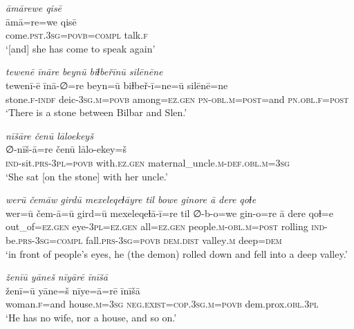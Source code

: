 \ea \label{ZP.46}
\textit{āmārewe qisē} \\ 
\gll āmā=re=we qisē \\ 
 come\textsc{.pst}\textsc{.3sg}\textsc{=\textsc{povb}}\textsc{=\textsc{compl}} talk\textsc{.f} \\ 
\glt `[and] she has come to speak again'
\z 
 
\ea \label{ZP.50}
\textit{tewenē īnāre beynū biɫbeřīnū silēnēne} \\ 
\gll tewenī-ē īnā-∅=re beyn=ū biɫbeř-ī=ne=ū silēnē=ne \\ 
 stone\textsc{.f}\textsc{-indf} deic\textsc{-3sg}\textsc{.m}\textsc{=\textsc{povb}} among\textsc{\textsc{=ez.gen}} \textsc{pn}\textsc{-obl}\textsc{.m}\textsc{=\textsc{post}}=and \textsc{pn}\textsc{.obl}\textsc{.f}\textsc{=\textsc{post}} \\ 
\glt `There is a stone between Bilbar and Slen.'
\z 
 
\ea \label{ZP.56}
\textit{nīšāre čenū lāloekeyš} \\ 
\gll ∅-nīš-ā=re čenū lālo-ekey=š \\ 
 \textsc{ind-}sit\textsc{.prs}\textsc{-3pl}\textsc{=\textsc{povb}} with\textsc{.ez.gen} maternal\_uncle\textsc{.m}\textsc{-def}\textsc{.obl}\textsc{.m}\textsc{=3sg} \\ 
\glt `She sat [on the stone] with her uncle.'
\z 
 
\ea \label{ZP.80}
\textit{werū čemāw girdū mexeleqeɫāyre til bowe ginore ā dere qoɫe} \\ 
\gll wer=ū čem-ā=ū gird=ū mexeleqeɫā-ī=re til ∅-b-o=we gin-o=re ā dere qoɫ=e \\ 
 out\_of\textsc{\textsc{=ez.gen}} eye\textsc{-3pl}\textsc{\textsc{=ez.gen}} all\textsc{\textsc{=ez.gen}} people\textsc{.m}\textsc{-obl}\textsc{.m}\textsc{=\textsc{post}} rolling \textsc{ind-}be\textsc{.prs}\textsc{-3sg}\textsc{=compl} fall\textsc{.prs}\textsc{-3sg}\textsc{=\textsc{povb}} \textsc{dem.dist} valley\textsc{.m} deep\textsc{=dem} \\ 
\glt `in front of people’s eyes, he (the demon) rolled down and fell into a deep valley.'
\z 
 
\ea \label{ZP.87}
\textit{ženīū yāneš nīyārē īnīšā} \\ 
\gll ženī=ū yāne=š nīye=ā=rē īnīšā \\ 
 woman\textsc{.f}=and house\textsc{.m}\textsc{=3sg} \textsc{\textsc{neg.}exist}\textsc{=cop}\textsc{.3sg}\textsc{.m}\textsc{=\textsc{povb}} dem.prox\textsc{.obl}\textsc{.3pl} \\ 
\glt `He has no wife, nor a house, and so on.'
\z 
 
